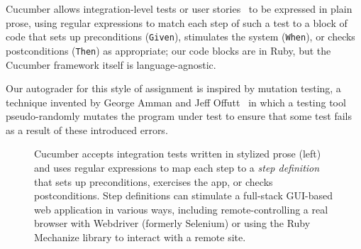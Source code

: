  Cucumber allows
integration-level tests or user stories~\cite{user-stories} to be
expressed in plain prose, using regular expressions to match each step
of such a test to a block of code that sets up preconditions (\texttt{Given}), stimulates
the system (\texttt{When}), or checks postconditions (\texttt{Then}) as
appropriate; our code blocks are in Ruby, but the Cucumber framework
itself is language-agnostic.  


Our autograder for this
style of assignment is inspired by mutation testing, a technique invented
by George Amman and Jeff 
Offutt~\cite{ammann-offutt-sw-testing} in which a
testing tool pseudo-randomly mutates the program under test to ensure
that some test fails as a result of these introduced errors.



\begin{figure}
  \begin{minipage}{0.45\textwidth}%
  \end{minipage}%
  \begin{minipage}{0.5\textwidth}%
  \end{minipage}%
  \caption{\label{fig:cucumber} Cucumber accepts integration tests 
    written in stylized prose (left) and uses regular expressions to map each
    step to a \emph{step definition} that sets up preconditions, exercises the app,
    or checks postconditions.  Step definitions 
    can stimulate a full-stack GUI-based web application in various
    ways, including remote-controlling a real browser with Webdriver
    (formerly Selenium) or using the Ruby Mechanize library to interact
    with a remote site.}
\end{figure}



